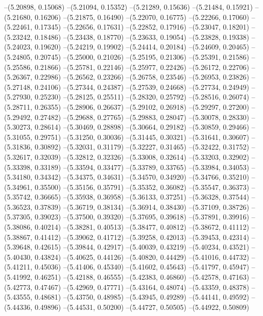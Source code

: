 --(5.20898, 0.15068)
--(5.21094, 0.15352)
--(5.21289, 0.15636)
--(5.21484, 0.15921)
--(5.21680, 0.16206)
--(5.21875, 0.16490)
--(5.22070, 0.16775)
--(5.22266, 0.17060)
--(5.22461, 0.17345)
--(5.22656, 0.17631)
--(5.22852, 0.17916)
--(5.23047, 0.18201)
--(5.23242, 0.18486)
--(5.23438, 0.18770)
--(5.23633, 0.19054)
--(5.23828, 0.19338)
--(5.24023, 0.19620)
--(5.24219, 0.19902)
--(5.24414, 0.20184)
--(5.24609, 0.20465)
--(5.24805, 0.20745)
--(5.25000, 0.21026)
--(5.25195, 0.21306)
--(5.25391, 0.21586)
--(5.25586, 0.21866)
--(5.25781, 0.22146)
--(5.25977, 0.22426)
--(5.26172, 0.22706)
--(5.26367, 0.22986)
--(5.26562, 0.23266)
--(5.26758, 0.23546)
--(5.26953, 0.23826)
--(5.27148, 0.24106)
--(5.27344, 0.24387)
--(5.27539, 0.24668)
--(5.27734, 0.24949)
--(5.27930, 0.25230)
--(5.28125, 0.25511)
--(5.28320, 0.25792)
--(5.28516, 0.26074)
--(5.28711, 0.26355)
--(5.28906, 0.26637)
--(5.29102, 0.26918)
--(5.29297, 0.27200)
--(5.29492, 0.27482)
--(5.29688, 0.27765)
--(5.29883, 0.28047)
--(5.30078, 0.28330)
--(5.30273, 0.28614)
--(5.30469, 0.28898)
--(5.30664, 0.29182)
--(5.30859, 0.29466)
--(5.31055, 0.29751)
--(5.31250, 0.30036)
--(5.31445, 0.30321)
--(5.31641, 0.30607)
--(5.31836, 0.30892)
--(5.32031, 0.31179)
--(5.32227, 0.31465)
--(5.32422, 0.31752)
--(5.32617, 0.32039)
--(5.32812, 0.32326)
--(5.33008, 0.32614)
--(5.33203, 0.32902)
--(5.33398, 0.33189)
--(5.33594, 0.33477)
--(5.33789, 0.33765)
--(5.33984, 0.34053)
--(5.34180, 0.34342)
--(5.34375, 0.34631)
--(5.34570, 0.34920)
--(5.34766, 0.35210)
--(5.34961, 0.35500)
--(5.35156, 0.35791)
--(5.35352, 0.36082)
--(5.35547, 0.36373)
--(5.35742, 0.36665)
--(5.35938, 0.36958)
--(5.36133, 0.37251)
--(5.36328, 0.37544)
--(5.36523, 0.37839)
--(5.36719, 0.38134)
--(5.36914, 0.38430)
--(5.37109, 0.38726)
--(5.37305, 0.39023)
--(5.37500, 0.39320)
--(5.37695, 0.39618)
--(5.37891, 0.39916)
--(5.38086, 0.40214)
--(5.38281, 0.40513)
--(5.38477, 0.40812)
--(5.38672, 0.41112)
--(5.38867, 0.41412)
--(5.39062, 0.41712)
--(5.39258, 0.42013)
--(5.39453, 0.42314)
--(5.39648, 0.42615)
--(5.39844, 0.42917)
--(5.40039, 0.43219)
--(5.40234, 0.43521)
--(5.40430, 0.43824)
--(5.40625, 0.44126)
--(5.40820, 0.44429)
--(5.41016, 0.44732)
--(5.41211, 0.45036)
--(5.41406, 0.45340)
--(5.41602, 0.45643)
--(5.41797, 0.45947)
--(5.41992, 0.46251)
--(5.42188, 0.46555)
--(5.42383, 0.46860)
--(5.42578, 0.47163)
--(5.42773, 0.47467)
--(5.42969, 0.47771)
--(5.43164, 0.48074)
--(5.43359, 0.48378)
--(5.43555, 0.48681)
--(5.43750, 0.48985)
--(5.43945, 0.49289)
--(5.44141, 0.49592)
--(5.44336, 0.49896)
--(5.44531, 0.50200)
--(5.44727, 0.50505)
--(5.44922, 0.50809)

